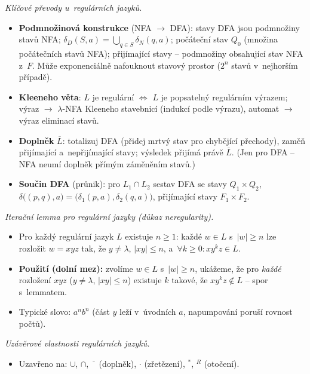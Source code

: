 \documentclass[11pt,a4paper]{article}
\begin{document}
\begin{poznamka}
\smallskip
\emph{Klíčové převody u~regulárních jazyků.}
\begin{itemize}
  \item \textbf{Podmnožinová konstrukce} (NFA $\to$ DFA): stavy DFA jsou podmnožiny stavů NFA; $\delta_D(S,a)=\bigcup_{q\in S}\delta_N(q,a)$; počáteční stav $Q_0$ (množina počátečních stavů NFA); přijímající stavy -- podmnožiny obsahující stav NFA z~$F$. Může exponenciálně nafouknout stavový prostor ($2^n$ stavů v~nejhorším případě).
  \item \textbf{Kleeneho věta}: $L$ je regulární $\iff$ $L$ je popsatelný regulárním výrazem; výraz $\to$ $\lambda$-NFA Kleeneho stavebnicí (indukcí podle výrazu), automat $\to$ výraz eliminací stavů.
  \item \textbf{Doplněk} $\overline L$: totalizuj DFA (přidej mrtvý stav pro chybějící přechody), zaměň přijímající a~nepřijímající stavy; výsledek přijímá právě $\overline L$. (Jen pro DFA -- NFA neumí doplněk přímým záměněním stavů.)
  \item \textbf{Součin DFA} (průnik): pro $L_1\cap L_2$ sestav DFA se stavy $Q_1\times Q_2$, $\delta\bigl((p,q),a\bigr)=\bigl(\delta_1(p,a),\delta_2(q,a)\bigr)$, přijímající stavy $F_1\times F_2$.
\end{itemize}

\smallskip
\emph{Iterační lemma pro regulární jazyky (důkaz neregularity).}
\begin{itemize}
  \item Pro každý regulární jazyk $L$ existuje $n\ge 1$: každé $w\in L$ s~$|w|\ge n$ lze rozložit $w=xyz$ tak, že $y\neq\lambda$, $|xy|\le n$, a~$\forall k\ge 0\colon xy^kz\in L$.
  \item \textbf{Použití (dolní mez):} zvolíme $w\in L$ s~$|w|\ge n$, ukážeme, že pro \emph{každé} rozložení $xyz$ ($y\neq\lambda$, $|xy|\le n$) existuje $k$ takové, že $xy^kz\notin L$ -- spor s~lemmatem.
  \item Typické slovo: $a^nb^n$ (část $y$ leží v~úvodních $a$, napumpování poruší rovnost počtů).
\end{itemize}

\smallskip
\emph{Uzávěrové vlastnosti regulárních jazyků.}
\begin{itemize}
  \item Uzavřeno na: $\cup$, $\cap$, $\overline{\phantom{x}}$ (doplněk), $\cdot$ (zřetězení), ${}^*$, ${}^R$ (otočení).
\end{itemize}


\end{poznamka}
\end{document}
